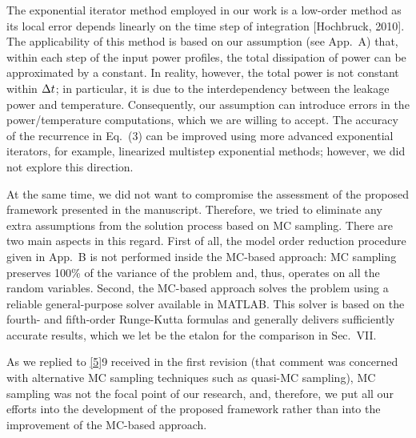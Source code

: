 \begin{authors}
The exponential iterator method employed in our work is a low-order method as its local error depends linearly on the time step of integration [Hochbruck, 2010].
The applicability of this method is based on our assumption (see App.~A) that, within each step of the input power profiles, the total dissipation of power can be approximated by a constant.
In reality, however, the total power is not constant within $\Delta t$; in particular, it is due to the interdependency between the leakage power and temperature.
Consequently, our assumption can introduce errors in the power/temperature computations, which we are willing to accept.
The accuracy of the recurrence in Eq.~(3) can be improved using more advanced exponential iterators, for example, linearized multistep exponential methods; however, we did not explore this direction.

At the same time, we did not want to compromise the assessment of the proposed framework presented in the manuscript.
Therefore, we tried to eliminate any extra assumptions from the solution process based on MC sampling.
There are two main aspects in this regard.
First of all, the model order reduction procedure given in App.~B is not performed inside the MC-based approach: MC sampling preserves 100\% of the variance of the problem and, thus, operates on all the random variables.
Second, the MC-based approach solves the problem using a reliable general-purpose solver available in MATLAB.
This solver is based on the fourth- and fifth-order Runge-Kutta formulas and generally delivers sufficiently accurate results, which we let be the etalon for the comparison in Sec.~VII.

As we replied to \cref{5}{9} received in the first revision (that comment was concerned with alternative MC sampling techniques such as quasi-MC sampling), MC sampling was not the focal point of our research, and, therefore, we put all our efforts into the development of the proposed framework rather than into the improvement of the MC-based approach.

\begin{actions}
\end{actions}
\end{authors}

